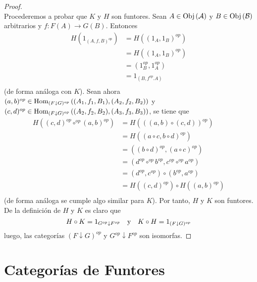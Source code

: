 \documentclass[12pt]{report}
\theoremstyle{largebreak}
\newcommand\cf[3]{\ensuremath{#1:#2\rightarrow#3}}
\newcommand{\Obj}[1]{\ensuremath{\textup{Obj}\left(#1\right)}}
\newcommand{\Hom}[3]{\ensuremath{\textup{Hom}_{#1}\left(#2,#3\right)}}
\begin{document}
\begin{proof}
\begin{equation*}
        \end{equation*}
        Procederemos a probar que $K$ y $H$ son funtores. Sean $A\in\Obj{\mathcal{A}}$ y $B\in\Obj{\mathcal{B}}$ arbitrarios y $\cf{f}{F(A)}{G(B)}$. Entonces
        \begin{equation*}
            \begin{split}
                H(1_{(A,f,B)^{op}})&=H((1_A,1_B)^{op})\\
                &=H((1_A,1_B)^{op})\\
                &=(1_B^{op},1_A^{op})\\
                &=1_{(B,f^{op}.A)}\\
            \end{split}
        \end{equation*}
        (de forma análoga con $K$). Sean ahora $(a,b)^{op}\in\Hom{(F\downarrow G)^{op}}{(A_1,f_1,B_1)}{(A_2,f_2,B_2)}$ y $(c,d)^{op}\in\Hom{(F\downarrow G)^{op}}{(A_2,f_2,B_2)}{(A_3,f_3,B_3)}$, se tiene que
        \begin{equation*}
            \begin{split}
                H((c,d)^{op}\circ^{op}(a,b)^{op})&=H(((a,b)\circ (c,d))^{op})\\
                &=H((a\circ c,b\circ d)^{op})\\
                &=((b\circ d)^{op},(a\circ c)^{op})\\
                &=(d^{op}\circ^{op}b^{op},c^{op}\circ^{op}a^{op})\\
                &=(d^{op},c^{op})\circ(b^{op},a^{op})\\
                &=H((c,d)^{op})\circ H((a,b)^{op})\\
            \end{split}
        \end{equation*}
        (de forma análoga se cumple algo similar para $K$). Por tanto, $H$ y $K$ son funtores. De la definición de $H$ y $K$ es claro que
        \begin{equation*}
            H\circ K=1_{G^{op}\downarrow F^{op}}\quad\textup{y}\quad K\circ H=1_{(F\downarrow G)^{op}}
        \end{equation*}
        luego, las categorías $(F\downarrow G)^{op}$ y $G^{op}\downarrow F^{op}$ son isomorfas.
    \end{proof}

    \section{Categorías de Funtores}
\end{document}
